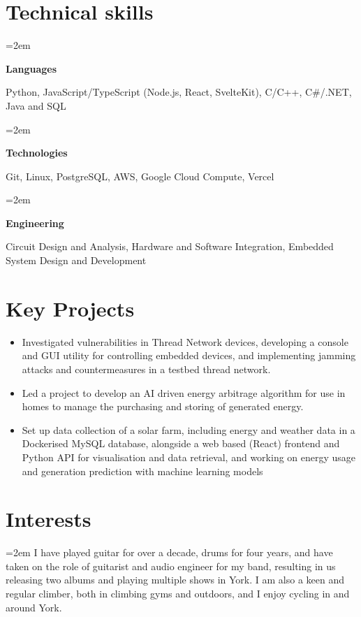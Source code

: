 \documentclass[12pt]{article} %
\newlength{\spacebox}
\newcommand{\skill}[2]{
  \noindent\hangindent=2em\hangafter=0
  \parbox{1.8\spacebox}{%
  \textbf{#1}} %
  {\small #2} \par} %
\newcommand{\interests}[1]{
  \vspace*{0.5em}
  \noindent\hangindent=2em\hangafter=0 \small #1 
}
\begin{document}
\section*{Technical skills}

\skill{Languages}{Python, JavaScript/TypeScript (Node.js, React, SvelteKit), C/C++, C\#/.NET, Java and SQL}
\skill{Technologies}{Git, Linux, PostgreSQL, AWS, Google Cloud Compute, Vercel}
\skill{Engineering}{Circuit Design and Analysis, Hardware and Software Integration, Embedded System Design and Development}

\section*{Key Projects}
\begin{itemize}
  \item Investigated vulnerabilities in Thread Network devices, developing a console and GUI utility for controlling embedded devices, and implementing jamming attacks and countermeasures in a testbed thread network.
  \item Led a project to develop an AI driven energy arbitrage algorithm for use in homes to manage the purchasing and storing of generated energy.
  \item Set up data collection of a solar farm, including energy and weather data in a Dockerised MySQL database, alongside a web based (React) frontend and Python API for visualisation and data retrieval, and working on energy usage and generation prediction with machine learning models
  
\end{itemize}

\section*{Interests}
\interests{I have played guitar for over a decade, drums for four years, and have taken on the role of guitarist and audio engineer for my band, resulting in us releasing two albums and playing multiple shows in York. I am also a keen and regular climber, both in climbing gyms and outdoors, and I enjoy cycling in and around York.}
\end{document}
